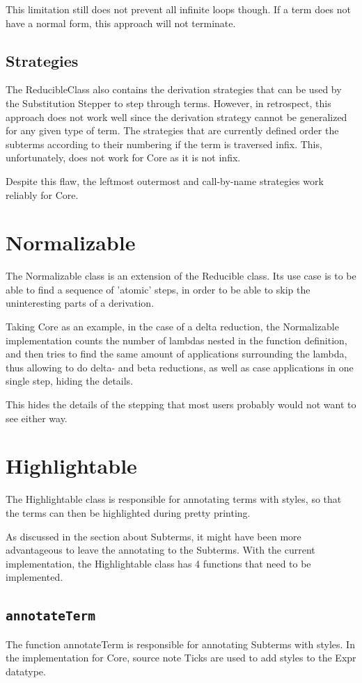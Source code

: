 This limitation still does not prevent all infinite loops though.
If a term does not have a normal form,
this approach will not terminate.

\subsection{Strategies}
The ReducibleClass also contains the derivation strategies that can be used by the Substitution Stepper to step through terms.
However, in retrospect,
this approach does not work well since the derivation strategy cannot be generalized for any given type of term.
The strategies that are currently defined order the subterms according to their numbering if the term is traversed infix.
This, unfortunately, does not work for Core as it is not infix.

Despite this flaw, the leftmost outermost and call-by-name strategies work reliably for Core.

\section{Normalizable}
The Normalizable class is an extension of the Reducible class.
Its use case is to be able to find a sequence of 'atomic' steps,
in order to be able to skip the uninteresting parts of a derivation.

Taking Core as an example,
in the case of a delta reduction,
the Normalizable implementation counts the number of lambdas nested in the function definition,
and then tries to find the same amount of applications surrounding the lambda,
thus allowing to do delta- and beta reductions, as well as case applications in one single step, hiding the details.

This hides the details of the stepping that most users probably would not want to see either way.


\section{Highlightable}
The Highlightable class is responsible for annotating terms with styles,
so that the terms can then be highlighted during pretty printing.

As discussed in the section about Subterms,
it might have been more advantageous to leave the annotating to the Subterms.
With the current implementation,
the Highlightable class has 4 functions that need to be implemented.

\subsection{\texttt{annotateTerm}}
The function annotateTerm is responsible for annotating Subterms with styles.
In the implementation for Core,
source note Ticks are used to add styles to the Expr datatype.

